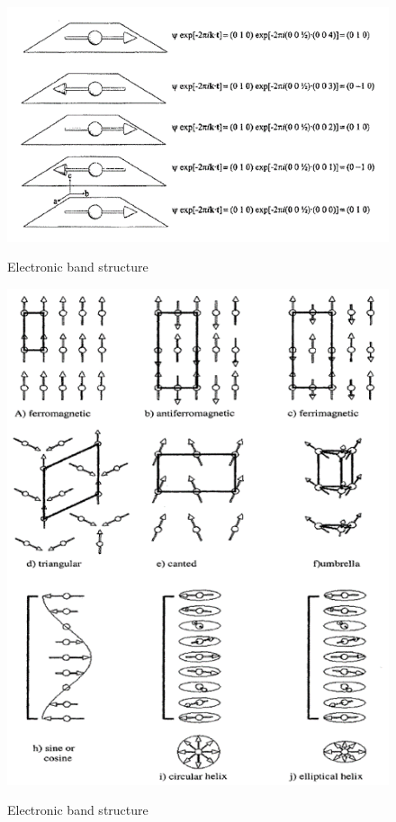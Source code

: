 \documentclass[11pt,edeposit,draftthesis]{uiucthesis2020}
\begin{document}
\begin{mainmatter}
\begin{figure}
\centering\includegraphics[width=\columnwidth]{figures/ch3/propagation_vector.png} \\
\caption{\label{fig:propagation_vector}
Electronic band structure
}
\end{figure}

\begin{figure}
\centering\includegraphics[width=\columnwidth]{figures/ch3/mag_structures_single_k.png} \\
\caption{\label{fig:mag_structures_single_k}
Electronic band structure
}
\end{figure}


\end{mainmatter}
\end{document}
